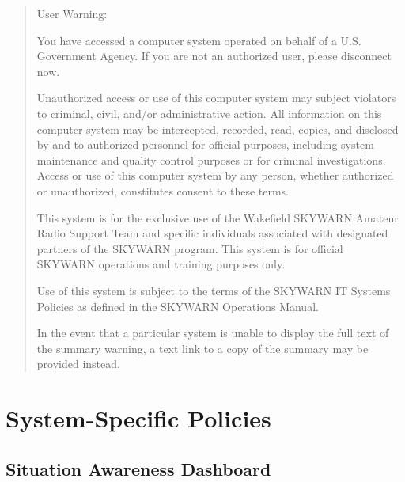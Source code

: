 \documentclass[pdflatex,letterpaper,twoside,12pt]{book}
\begin{document}
\begin{quote}
User Warning:

You have accessed a computer system operated on behalf of a U.S. Government Agency. If you are not an authorized user, please disconnect now.

Unauthorized access or use of this computer system may subject violators to criminal, civil, and/or administrative action.  All information on this computer system may be intercepted, recorded, read, copies, and disclosed by and to authorized personnel for official purposes, including system maintenance and quality control purposes or for criminal investigations.  Access or use of this computer system by any person, whether authorized or unauthorized, constitutes consent to these terms.

This system is for the exclusive use of the Wakefield SKYWARN Amateur Radio Support Team and specific individuals associated with designated partners of the SKYWARN program.  This system is for official SKYWARN operations and training purposes only.

Use of this system is subject to the terms of the SKYWARN IT Systems Policies as defined in the SKYWARN Operations Manual.

In the event that a particular system is unable to display the full text of the summary warning, a text link to a copy of the summary may be provided instead.
\end{quote}


\chapter{System-Specific Policies}


\section{Situation Awareness Dashboard}
\end{document}
